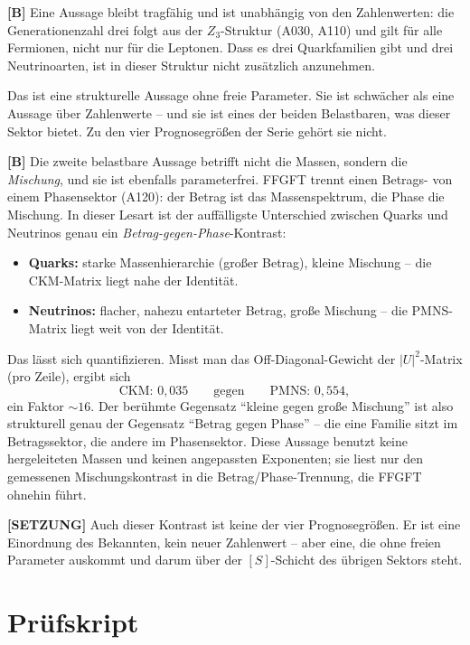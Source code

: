 \textbf{[B]} Eine Aussage bleibt tragfähig und ist unabhängig von den
Zahlenwerten: die Generationenzahl drei folgt aus der $Z_3$-Struktur (A030,
A110) und gilt für alle Fermionen, nicht nur für die Leptonen. Dass es drei
Quarkfamilien gibt und drei Neutrinoarten, ist in dieser Struktur nicht
zusätzlich anzunehmen.

Das ist eine strukturelle Aussage ohne freie Parameter. Sie ist schwächer als
eine Aussage über Zahlenwerte -- und sie ist eines der beiden Belastbaren, was
dieser Sektor bietet. Zu den vier Prognosegrößen der Serie gehört sie nicht.

\textbf{[B]} Die zweite belastbare Aussage betrifft nicht die Massen, sondern die
\emph{Mischung}, und sie ist ebenfalls parameterfrei. FFGFT trennt einen
Betrags- von einem Phasensektor (A120): der Betrag ist das Massenspektrum, die
Phase die Mischung. In dieser Lesart ist der auffälligste Unterschied zwischen
Quarks und Neutrinos genau ein \emph{Betrag-gegen-Phase}-Kontrast:
\begin{itemize}
  \item \textbf{Quarks:} starke Massenhierarchie (großer Betrag), kleine
    Mischung -- die CKM-Matrix liegt nahe der Identität.
  \item \textbf{Neutrinos:} flacher, nahezu entarteter Betrag, große Mischung --
    die PMNS-Matrix liegt weit von der Identität.
\end{itemize}
Das lässt sich quantifizieren. Misst man das Off-Diagonal-Gewicht der
$|U|^2$-Matrix (pro Zeile), ergibt sich
\[
  \text{CKM: } 0{,}035 \qquad\text{gegen}\qquad \text{PMNS: } 0{,}554,
\]
ein Faktor $\sim 16$. Der berühmte Gegensatz \enquote{kleine gegen große
Mischung} ist also strukturell genau der Gegensatz \enquote{Betrag gegen Phase}
-- die eine Familie sitzt im Betragssektor, die andere im Phasensektor. Diese
Aussage benutzt keine hergeleiteten Massen und keinen angepassten Exponenten;
sie liest nur den gemessenen Mischungskontrast in die Betrag/Phase-Trennung, die
FFGFT ohnehin führt.

\textbf{[SETZUNG]} Auch dieser Kontrast ist keine der vier Prognosegrößen. Er ist
eine Einordnung des Bekannten, kein neuer Zahlenwert -- aber eine, die ohne
freien Parameter auskommt und darum über der $[S]$-Schicht des übrigen Sektors
steht.

\section{Prüfskript}

